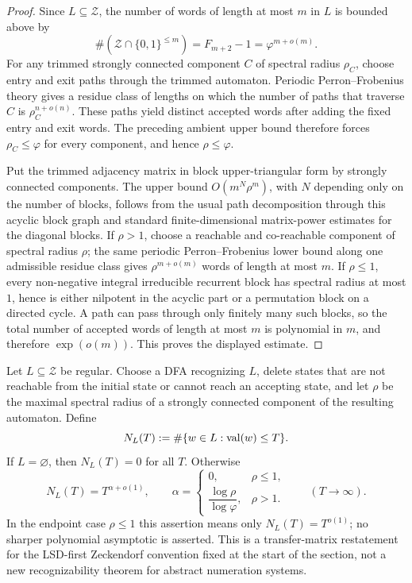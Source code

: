 \begin{proof}
  Since \(L\subseteq\mathcal Z\), the number of words of length at most
  \(m\) in \(L\) is bounded above by
  \[
    \#(\mathcal Z\cap\{0,1\}^{\le m})=F_{m+2}-1=\varphi^{m+o(m)}.
  \]
  For any trimmed strongly connected component \(C\) of spectral radius
  \(\rho_C\), choose entry and exit paths through the trimmed automaton.
  Periodic Perron--Frobenius theory gives a residue class of lengths on
  which the number of paths that traverse \(C\) is
  \(\rho_C^{n+o(n)}\). These paths yield distinct accepted words after
  adding the fixed entry and exit words. The preceding ambient upper
  bound therefore forces \(\rho_C\le\varphi\) for every component, and
  hence \(\rho\le\varphi\).

  Put the trimmed adjacency matrix in block upper-triangular form by
  strongly connected components. The upper bound
  \(O(m^N\rho^m)\), with \(N\) depending only on the number of blocks,
  follows from the usual path decomposition through this acyclic block
  graph and standard finite-dimensional matrix-power estimates for the
  diagonal blocks. If
  \(\rho>1\), choose a reachable and co-reachable component of spectral
  radius \(\rho\); the same periodic Perron--Frobenius lower bound along
  one admissible residue class gives \(\rho^{m+o(m)}\) words of length at
  most \(m\). If \(\rho\le1\), every non-negative integral irreducible
  recurrent block has spectral radius at most \(1\), hence is either
  nilpotent in the acyclic part or a permutation block on a directed
  cycle. A path can pass through only finitely many such blocks, so the
  total number of accepted words of length at most \(m\) is polynomial in
  \(m\), and therefore \(\exp(o(m))\). This proves the displayed
  estimate.
\end{proof}

\begin{proposition}
  \label{prop:zeckendorf-regular-powerlaw}
  Let \(L\subseteq\mathcal Z\) be regular. Choose a DFA recognizing
  \(L\), delete states that are not reachable from the initial state or
  cannot reach an accepting state, and let \(\rho\) be the maximal
  spectral radius of a strongly connected component of the resulting
  automaton. Define
  \[
    N_L(T):=\#\{w\in L:\operatorname{val}(w)\le T\}.
  \]
  If \(L=\varnothing\), then \(N_L(T)=0\) for all \(T\). Otherwise
  \[
    N_L(T)=T^{\alpha+o(1)},
    \qquad
    \alpha=
    \begin{cases}
      0, & \rho\le 1,\\[0.3em]
      \dfrac{\log \rho}{\log \varphi}, & \rho>1.
    \end{cases}
    \qquad (T\to\infty).
  \]
  In the endpoint case \(\rho\le1\) this assertion means only
  \(N_L(T)=T^{o(1)}\); no sharper polynomial asymptotic is asserted.
  This is a transfer-matrix restatement for the LSD-first Zeckendorf
  convention fixed at the start of the section, not a new
  recognizability theorem for abstract numeration systems.
\end{proposition}

